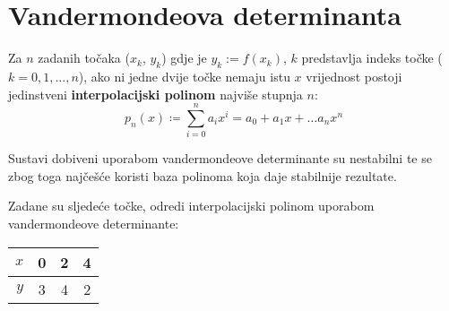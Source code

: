 \section{Vandermondeova determinanta}

Za $n$ zadanih točaka ($x_k$, $y_k$) gdje je $y_k := f(x_k)$, $k$ predstavlja indeks točke ($k = 0, 1, \dots, n$), ako ni jedne dvije točke nemaju istu $x$ vrijednost postoji jedinstveni \textbf{interpolacijski polinom} najviše stupnja $n$:
\begin{equation}
    p_n(x)\coloneq \sum_{i=0}^na_ix^i= a_0 + a_1x + \dots a_nx^n
\end{equation}

Sustavi dobiveni uporabom vandermondeove determinante su nestabilni te se zbog toga najčešće koristi baza polinoma koja daje stabilnije rezultate.

\begin{examplebox}
    Zadane su sljedeće točke, odredi interpolacijski polinom uporabom vandermondeove determinante:

    \center
    \begin{tabular}{r|c|c|c}
        $x$&0&2&4\\
        \hline
        $y$&3&4&2
    \end{tabular}
\end{examplebox}

